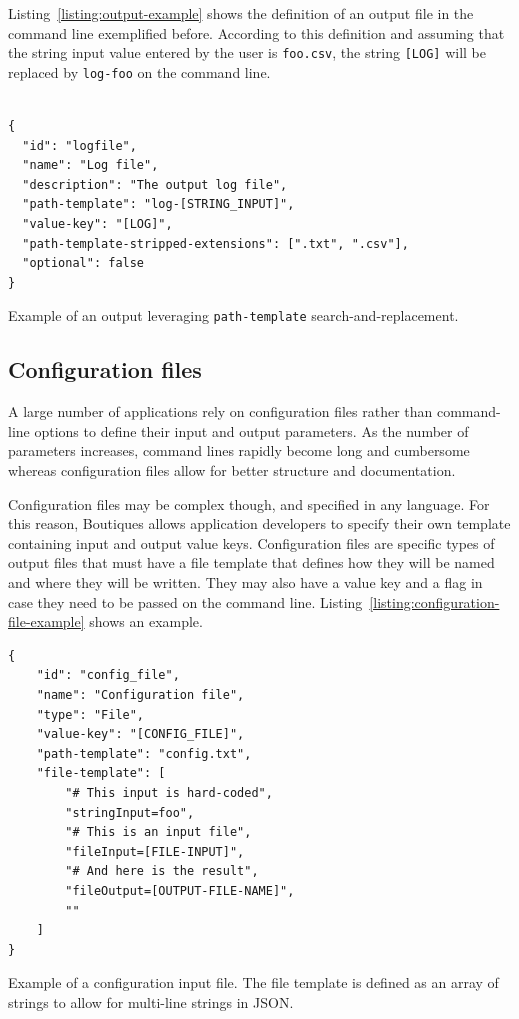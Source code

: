 \documentclass[a4paper,num-refs]{oup-contemporary}
\newcommand{\boutiques}{Boutiques\xspace}
\begin{document}
Listing~\ref{listing:output-example} shows the definition of an output
file in the command line exemplified before. According to this
definition and assuming that the string input value entered by the
user is \texttt{foo.csv}, the string \texttt{[LOG]} will be
replaced by \texttt{log-foo} on the command line.

\begin{listing}
\begin{verbatim}

{
  "id": "logfile",
  "name": "Log file",
  "description": "The output log file",
  "path-template": "log-[STRING_INPUT]",
  "value-key": "[LOG]",
  "path-template-stripped-extensions": [".txt", ".csv"],
  "optional": false
}
\end{verbatim}
\caption{Example of an output leveraging \texttt{path-template} search-and-replacement.} 
\label{listing:output-example}
\end{listing}

\subsection{Configuration files}

A large number of applications rely on configuration files rather than
command-line options to define their input and output parameters. As
the number of parameters increases, command lines rapidly become long
and cumbersome whereas configuration files allow for better structure
and documentation.

Configuration files may be complex though, and specified in any
language.  For this reason, \boutiques allows application developers
to specify their own template containing input and output value
keys. Configuration files are specific types of output files that must
have a file template that defines how
they will be named and where they will be written. They may also have
a value key and a flag in case they need to be passed on the command
line. Listing~\ref{listing:configuration-file-example} shows an
example.
\begin{listing}
\begin{verbatim}
{
    "id": "config_file",
    "name": "Configuration file",
    "type": "File",
    "value-key": "[CONFIG_FILE]",
    "path-template": "config.txt",
    "file-template": [
        "# This input is hard-coded",
        "stringInput=foo",
        "# This is an input file",
        "fileInput=[FILE-INPUT]",
        "# And here is the result",
        "fileOutput=[OUTPUT-FILE-NAME]",
        ""
    ]
}
\end{verbatim}
\caption{Example of a configuration input file. The file template is defined as
  an array of strings to allow for multi-line strings in JSON.}
\label{listing:configuration-file-example}
\end{listing}
\end{document}
